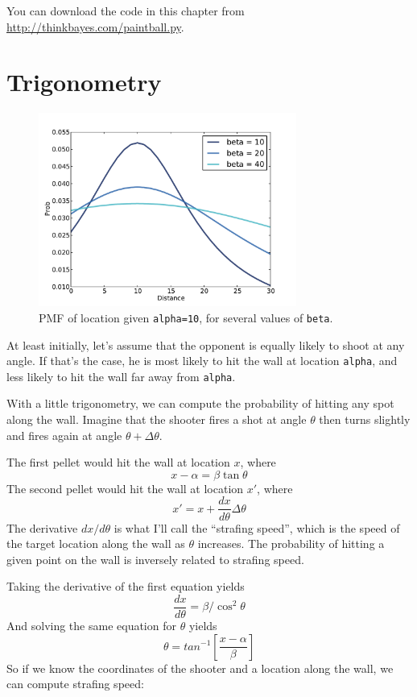 \documentclass[12pt]{book}
\begin{document}
You can download the code in this chapter from
\url{http://thinkbayes.com/paintball.py}.

\section{Trigonometry}

\begin{figure}
\centerline{\includegraphics[height=2.5in]{figs/paintball1.pdf}}
\caption{PMF of location given {\tt alpha=10}, for several values of
  {\tt beta}.}
\label{fig.paintball1}
\end{figure}

At least initially, let's assume that the opponent is equally likely
to shoot at any angle.  If that's the case, he is most likely to hit
the wall at location {\tt alpha}, and less likely to hit the wall far
away from {\tt alpha}.

With a little trigonometry, we can compute the probability of hitting
any spot along the wall.  Imagine that the shooter fires a shot at
angle $\theta$ then turns slightly and fires again at angle $\theta +
\Delta\theta$.

The first pellet would hit the wall at location $x$, where
%
\[ x - \alpha = \beta \tan \theta \]
%
The second pellet would hit the wall at location $x'$, where
%
\[ x' = x + \frac{dx}{d\theta} \Delta\theta \]
%
The derivative $dx/d\theta$ is what I'll call the ``strafing speed'',
which is the speed of the target location along the wall as $\theta$
increases.  The probability of hitting a given point on the wall is
inversely related to strafing speed.

Taking the derivative of the first equation yields
%
\[ \frac{dx}{d\theta} = \beta / \cos^2 \theta \]
%
And solving the same equation for $\theta$ yields
%
\[ \theta = tan^{-1} \left[ \frac{x - \alpha}{\beta} \right] \]
%
So if we know the coordinates of the shooter and a location 
along the wall, we can compute strafing speed:
\end{document}
